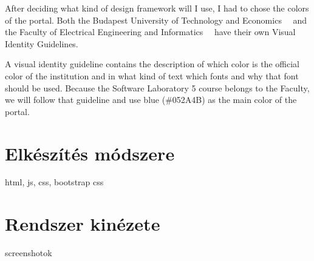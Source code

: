 After deciding what kind of design framework will I use, I had to chose the colors of the portal. Both the Budapest University of Technology and Economics~\cite{BME-Arculat}~\cite{BME-Arculat-Intranet} and the Faculty of Electrical Engineering and Informatics~\cite{VIK-Arculat}~\cite{VIK-Arculat-PDF} have their own Visual Identity Guidelines. 

A visual identity guideline contains the description of which color is the official color of the institution and in what kind of text which fonts and why that font should be used. Because the Software Laboratory 5 course belongs to the Faculty, we will follow that guideline and use blue (\#052A4B) as the main color of the portal. 

\section{Elkészítés módszere}

html, js, css, bootstrap css


\section{Rendszer kinézete}

screenshotok

